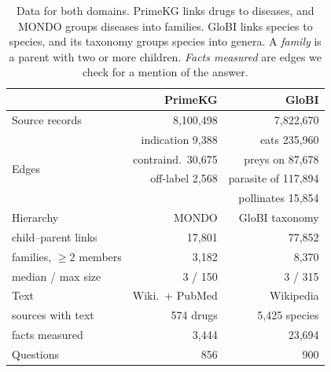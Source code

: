 \begin{table}[t]
\centering
\small
\setlength{\tabcolsep}{3.5pt}
\begin{tabular}{@{}lrr@{}}
\toprule
 & PrimeKG & GloBI \\
\midrule
Source records & 8,100,498 & 7,822,670 \\
\midrule
\multirow{4}{*}{Edges} & indication 9,388 & eats 235,960 \\
 & contraind.\ 30,675 & preys on 87,678 \\
 & off-label 2,568 & parasite of 117,894 \\
 & & pollinates 15,854 \\
\midrule
Hierarchy & MONDO & GloBI taxonomy \\
\quad child--parent links & 17,801 & 77,852 \\
\quad families, $\ge$2 members & 3,182 & 8,370 \\
\quad median / max size & 3 / 150 & 3 / 315 \\
\midrule
Text & Wiki.\ + PubMed & Wikipedia \\
\quad sources with text & 574 drugs & 5,425 species \\
\quad facts measured & 3,444 & 23,694 \\
Questions & 856 & 900 \\
\bottomrule
\end{tabular}
\caption{Data for both domains. PrimeKG links drugs to diseases, and MONDO groups diseases into families. GloBI links species to species, and its taxonomy groups species into genera. A \emph{family} is a parent with two or more children. \emph{Facts measured} are edges we check for a mention of the answer.}
\label{tab:data}
\end{table}

